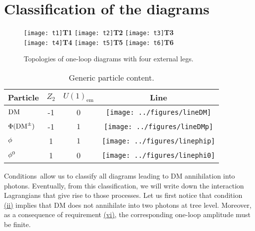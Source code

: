 \section{Classification of the diagrams}
\label{sec:top}

\begin{figure}
\centering
\texttt{[image: t1]}\hspace{-2.4cm}\textbf{T1}\hspace{2.4cm}
\texttt{[image: t2]}\hspace{-2.4cm}\textbf{T2}\hspace{2.4cm}
\texttt{[image: t3]}\hspace{-2.4cm}\textbf{T3}\\
\texttt{[image: t4]}\hspace{-2.4cm}\textbf{T4}\hspace{2.4cm}
\texttt{[image: t5]}\hspace{-2.4cm}\textbf{T5}\hspace{2.4cm}
\texttt{[image: t6]}\hspace{-2.4cm}\textbf{T6}
\caption{Topologies of one-loop diagrams with four external legs.}
\label{fig:topologies}
\end{figure}

\begin{table}[h]
\centering
\begin{tabular}{|lccc|}\hline
Particle & {\bf $Z_2$} & {\bf $U(1)_\text{em}$} & Line\\\hline\hline
$\text{DM}$ & -1 & 0 & \texttt{[image: ../figures/lineDM]} \\
${\Phi}(\text{DM}^{\pm})$ & -1 & $1$ & \texttt{[image: ../figures/lineDMp]} \\
${\phi}$ & 1 & $1$ & \texttt{[image: ../figures/linephip]}\\
${\phi^0}$ & 1 & 0 & \texttt{[image: ../figures/linephi0]}\\\hline
\end{tabular}
\caption{Generic particle content.}
\label{table:mediators}
\end{table}

Conditions \cond  $\,$allow us to classify all diagrams leading to DM annihilation into photons. Eventually, from this classification, we will write down the interaction Lagrangians that give rise to those processes.  
Let us first notice that condition \hyperref[condition:ii]{(ii)}  implies that DM does not annihilate into two photons at tree level. Moreover, as a consequence of requirement \hyperref[condition:vi]{(vi)}, the corresponding one-loop amplitude  must be finite.  

